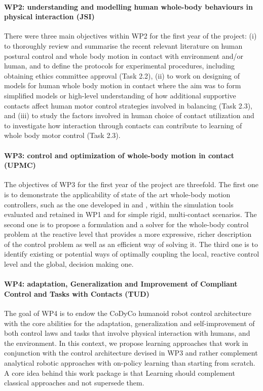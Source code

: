 \documentclass[12pt,a4paper,twoside]{article}
\begin{document}
\paragraph{WP2: understanding and modelling human whole-body behaviours in physical interaction (JSI)}

There were three main objectives within WP2 for the first year of the project: (i) to thoroughly review and summarise the recent relevant literature on human postural control and whole body motion in contact with environment and/or human, and to define the protocols for experimental procedures, including obtaining ethics committee approval (Task 2.2), (ii) to work on designing of models for human whole body motion in contact where the aim was to form simplified models or high-level understanding of how additional supportive contacts affect human motor control strategies involved in balancing (Task 2.3), and (iii) to study the factors involved in human choice of contact utilization and to investigate how interaction through contacts can contribute to learning of whole body motor control (Task 2.3).

\paragraph{WP3: control and optimization of whole-body motion in contact (UPMC)}

The objectives of WP3 for the first year of the project are threefold. The first one is to demonstrate the applicability of state of the art whole-body motion controllers, such as the one developed in \cite{salini2012} and \cite{delprete2013}, within the simulation tools evaluated and retained in WP1 and for simple rigid, multi-contact scenarios. The second one is to propose a formulation and a solver for the whole-body control problem at the reactive level that provides a more expressive, richer description of the control problem as well as an efficient way of solving it. The third one is to identify existing or potential ways of optimally coupling the local, reactive control level and the global, decision making one.

\paragraph{WP4: adaptation, Generalization and Improvement of Compliant Control and Tasks with Contacts (TUD)}

The goal of WP4 is to endow the CoDyCo humanoid robot control architecture with the core abilities for the
adaptation, generalization and self-improvement of both control laws and tasks that involve physical interaction
with humans, and the environment. In this context, we propose learning approaches that work in conjunction
with the control architecture devised in WP3 and rather complement analytical robotic approaches with on-policy
learning than starting from scratch. A core idea behind this work package is that Learning should complement
classical approaches and not supersede them.
\end{document}
